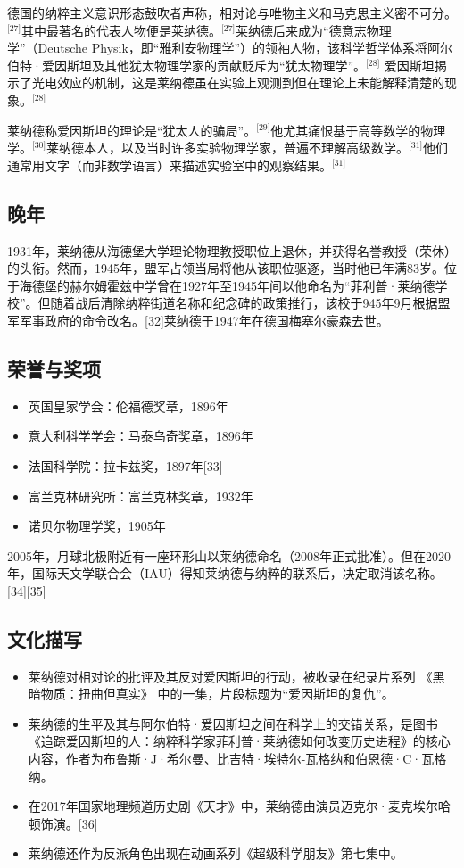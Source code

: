 德国的纳粹主义意识形态鼓吹者声称，相对论与唯物主义和马克思主义密不可分。\(^\text{[27]}\)其中最著名的代表人物便是莱纳德。\(^\text{[27]}\)莱纳德后来成为“德意志物理学”（Deutsche Physik，即“雅利安物理学”）的领袖人物，该科学哲学体系将阿尔伯特·爱因斯坦及其他犹太物理学家的贡献贬斥为“犹太物理学”。\(^\text{[28]}\) 爱因斯坦揭示了光电效应的机制，这是莱纳德虽在实验上观测到但在理论上未能解释清楚的现象。\(^\text{[28]}\)

莱纳德称爱因斯坦的理论是“犹太人的骗局”。\(^\text{[29]}\)他尤其痛恨基于高等数学的物理学。\(^\text{[30]}\)莱纳德本人，以及当时许多实验物理学家，普遍不理解高级数学。\(^\text{[31]}\)他们通常用文字（而非数学语言）来描述实验室中的观察结果。\(^\text{[31]}\)
\subsection{晚年}
1931年，莱纳德从海德堡大学理论物理教授职位上退休，并获得名誉教授（荣休）的头衔。然而，1945年，盟军占领当局将他从该职位驱逐，当时他已年满83岁。位于海德堡的赫尔姆霍兹中学曾在1927年至1945年间以他命名为“菲利普·莱纳德学校”。但随着战后清除纳粹街道名称和纪念碑的政策推行，该校于945年9月根据盟军军事政府的命令改名。[32]莱纳德于1947年在德国梅塞尔豪森去世。
\subsection{荣誉与奖项}
\begin{itemize}
\item 英国皇家学会：伦福德奖章，1896年
\item 意大利科学学会：马泰乌奇奖章，1896年
\item 法国科学院：拉卡兹奖，1897年[33]
\item 富兰克林研究所：富兰克林奖章，1932年
\item 诺贝尔物理学奖，1905年
\end{itemize}
2005年，月球北极附近有一座环形山以莱纳德命名（2008年正式批准）。但在2020年，国际天文学联合会（IAU）得知莱纳德与纳粹的联系后，决定取消该名称。[34][35]
\subsection{文化描写}
\begin{itemize}
\item 莱纳德对相对论的批评及其反对爱因斯坦的行动，被收录在纪录片系列 《黑暗物质：扭曲但真实》 中的一集，片段标题为“爱因斯坦的复仇”。
\item 莱纳德的生平及其与阿尔伯特·爱因斯坦之间在科学上的交错关系，是图书 《追踪爱因斯坦的人：纳粹科学家菲利普·莱纳德如何改变历史进程》的核心内容，作者为布鲁斯·J·希尔曼、比吉特·埃特尔-瓦格纳和伯恩德·C·瓦格纳。
\item 在2017年国家地理频道历史剧《天才》中，莱纳德由演员迈克尔·麦克埃尔哈顿饰演。[36]
\item 莱纳德还作为反派角色出现在动画系列《超级科学朋友》第七集中。
\end{itemize}
